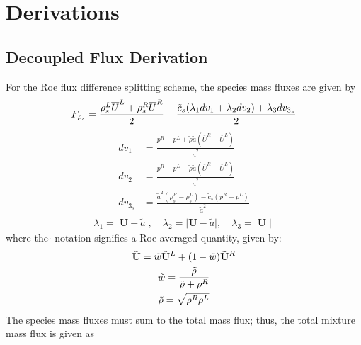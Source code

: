 \chapter{Derivations}
\label{derivations}

\section{Decoupled Flux Derivation}
\label{decoupled-flux-derivation}

For the Roe flux difference splitting scheme, the species mass fluxes are given by
\begin{equation}
	F_{\rho_s} = \frac{\rho_s^L\overline{U}^L+\rho_s^R\overline{U}^R}{2}
	-\frac{\tilde{c}_s(\lambda_1 dv_1 + \lambda_2 dv_2)+\lambda_3 dv_{3_s}}{2}
  \label{species-mass} \\
\end{equation}
\begin{align}	
		dv_1 &= \frac{p^R-p^L+\tilde{\rho} \tilde{a} (\overline{U}^R-\overline{U}^L)}{\tilde{a}^2} \\
		dv_2 &= \frac{p^R-p^L-\tilde{\rho} \tilde{a} (\overline{U}^R-\overline{U}^L)}{\tilde{a}^2} \\
		dv_{3_s} &= \frac{\tilde{a}^2 (\rho_s^R-\rho_s^L)- \tilde{c}_s (p^R-p^L)}{\tilde{a}^2}
\end{align}
\begin{align}
	\lambda_1 = \mid\mathbf{\overline{U}}+\tilde{a} \mid,\quad 
	\lambda_2 = \mid \mathbf{\overline{U}}-\tilde{a} \mid,\quad 
	\lambda_3 =  \mid \mathbf{\overline{U}} \mid
\end{align}
where the $\tilde{}$ notation signifies a Roe-averaged quantity, given by:
\begin{gather}
	\mathbf{\tilde{U}} =\tilde{w} \mathbf{\tilde{U}}^L+(1-\tilde{w})\mathbf{\tilde{U}}^R \\
	\tilde{w} = \frac{\tilde{\rho}}{\tilde{\rho}+\rho^R} \\
	\tilde{\rho} = \sqrt{\rho^R\rho^L}
\end{gather}
The species mass fluxes must sum to the total mass flux; thus, the total mixture
mass flux is given as
